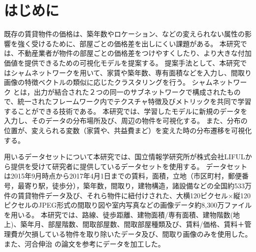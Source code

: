 \section{はじめに}
既存の賃貸物件の価格は、築年数やロケーション、などの変えられない属性の影響を強く受けるために、部屋ごとの価格差を出しにくい課題がある。
本研究では、不動産業者が物件の部屋ごとの価格差をつけやすくしたり、より大きな付加価値を提供できるための可視化モデルを提案する。
提案手法として、本研究ではシャムネットワークを用いて、家賃や築年数、専有面積などを入力し、間取り画像の特徴ベクトルの類似に応じたクラスタリングを行う。
シャムネットワーク  \cite{jj}  とは，出力が結合された２つの同一のサブネットワークで構成されたもので、統一されたフレームワーク内でテクスチャ特徴及びメトリックを共同で学習することができる技術である。
本研究では、学習したモデルに新規のデータを入力し、そのデータの分布場所及び、周辺の物件を可視化する。
また、分布の位置が、変えられる変数（家賃や、共益費まど）を変えた時の分布遷移を可視化する。


用いるデータセットについて本研究では、国立情報学研究所が株式会社LIFULから提供を受けて研究者に提供しているデータセットを使用する。
データセットは2015年9月時点から2017年4月1日までの賃料，面積，立地（市区町村，郵便番号，最寄り駅，徒歩分），築年数，間取り，建物構造，諸設備などの全国約533万件の賃貸物件データ及び、それら物件に紐付けされた、大横120ピクセル×縦120ピクセルのJPEG形式の間取り図や室内写真などの画像データ約8,300万ファイルを用いる。
本研究では、路線、徒歩距離、建物面積/専有面積、建物階数(地上)、築年月、部屋階数、間取部屋数、間取部屋種類及び、賃料/価格、賃料＋管理費が欠損している物件を取り除いたデータ及び、間取り画像のみを使用した。
また、河合伸治 \cite{kwa} の論文を参考にデータを加工した。
